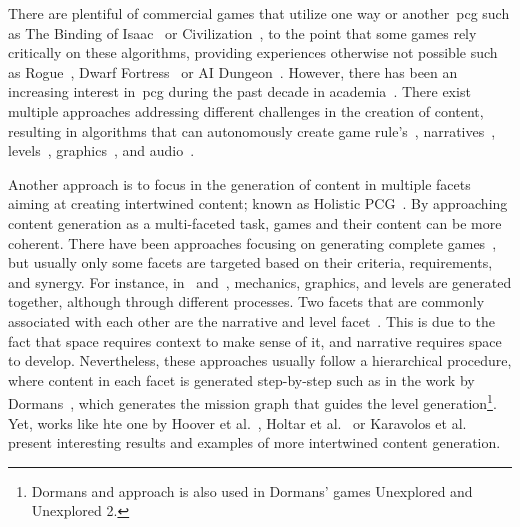 There are plentiful of commercial games that utilize one way or another~\acrshort{pcg} such as The Binding of Isaac~\cite{bindingISAAC} or Civilization~\cite{civilization}, to the point that some games rely critically on these algorithms, providing experiences otherwise not possible such as Rogue~\cite{rogue}, Dwarf Fortress~\cite{dwarfFortress} or AI Dungeon~\cite{aidungeon}. However, there has been an increasing interest in~\acrshort{pcg} during the past decade in academia~\cite{liapis_10_2020}. There exist multiple approaches addressing different challenges in the creation of content, resulting in algorithms that can autonomously create game rule's~\cite{browne_evolutionary_2010,font_towards_2013}, narratives~\cite{ashmore_quest_2007,ammanabrolu_toward_2019}, levels~\cite{shaker_evolving_2012,sarkar_sequential_2020,green_mario_2020}, graphics~\cite{horsley_building_2017,pagnutti_you_2016}, and audio~\cite{scirea_metacompose_2016,hoover_functional_2014}. 

Another approach is to focus in the generation of content in multiple facets aiming at creating intertwined content; known as Holistic PCG~\cite{liapis_orchestrating_2019,salge_generative_2018}. By approaching content generation as a multi-faceted task, games and their content can be more coherent. There have been approaches focusing on generating complete games~\cite{browne_evolutionary_2010,guzdial_conceptual_2020,cook_angelina_2017}, but usually only some facets are targeted based on their criteria, requirements, and synergy. For instance, in~\cite{cook_rogue_2014} and~\cite{treanor_game-o-matic_2012}, mechanics, graphics, and levels are generated together, although through different processes. Two facets that are commonly associated with each other are the narrative and level facet~\cite{dormans_generating_2011,hartsook_toward_2011,ashmore_quest_2007,abuzuraiq_taksim_2019}. This is due to the fact that space requires context to make sense of it, and narrative requires space to develop. Nevertheless, these approaches usually follow a hierarchical procedure, where content in each facet is generated step-by-step such as in the work by Dormans~\cite{dormans_generating_2011}, which generates the mission graph that guides the level generation\footnote{Dormans and approach is also used in Dormans' games Unexplored and Unexplored 2.}. Yet, works like hte one by Hoover et al.~\cite{hoover_audioinspace_2015}, Holtar et al.~\cite{holtar_audioverdrive_2013} or Karavolos et al.~\cite{karavolos_multi-faceted_2019} present interesting results and examples of more intertwined content generation.


